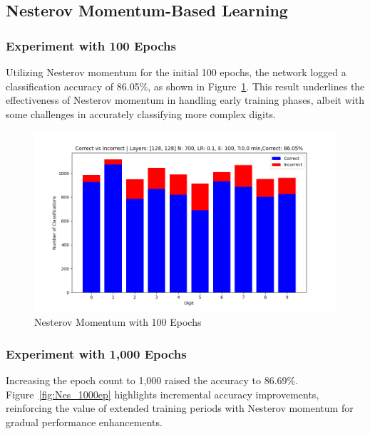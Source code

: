 \documentclass{article}
\begin{document}
\subsection{Nesterov Momentum-Based Learning}

\subsubsection{Experiment with 100 Epochs}
Utilizing Nesterov momentum for the initial 100 epochs, the network logged a classification accuracy of 86.05\%, as shown in Figure~\ref{fig:Nes_100ep}. This result underlines the effectiveness of Nesterov momentum in handling early training phases, albeit with some challenges in accurately classifying more complex digits.

\newpage

\begin{figure}[h!]
    \centering
    \includegraphics[scale=0.5]{../figs/Nes_100ep.png}
    \caption{Nesterov Momentum with 100 Epochs}
    \label{fig:Nes_100ep}
\end{figure}

\subsubsection{Experiment with 1,000 Epochs}
Increasing the epoch count to 1,000 raised the accuracy to 86.69\%. Figure~\ref{fig:Nes_1000ep} highlights incremental accuracy improvements, reinforcing the value of extended training periods with Nesterov momentum for gradual performance enhancements.
\end{document}
